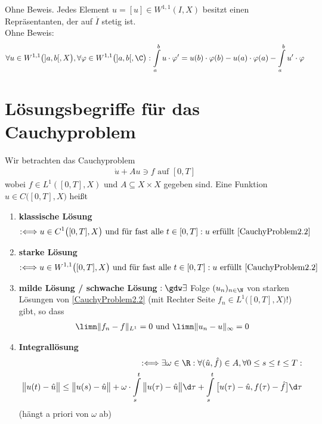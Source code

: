 Ohne Beweis. Jedes Element $u=[u]\in W^{1,1}(I,X)$ besitzt einen Repräsentanten, der auf $\overline{I}$ stetig ist.\\

Ohne Beweis:
\begin{align*}
\forall u\in W^{1,1}\big(]a,b[,X\big),\forall\varphi\in W^{1,1}\big(]a,b[,\C\big):
\int\limits_a^b u\cdot\varphi'=u(b)\cdot\varphi(b)-u(a)\cdot\varphi(a)-\int\limits_a^b u'\cdot\varphi
\end{align*}

\section*{Lösungsbegriffe für das Cauchyproblem} %
Wir betrachten das Cauchyproblem
\begin{align}\label{CauchyProblem2.2}\tag{CP}
\dot{u}+Au\ni f\text{ auf }[0,T] 
\end{align}
wobei $f\in L^1([0,T],X)$ und $A\subseteq X\times X$ gegeben sind. Eine Funktion $u\in C\big([0,T],X)$ heißt
\begin{enumerate}[label=(\alph*)]
\item \textbf{klassische Lösung}
\begin{align*}
:\Longleftrightarrow u\in C^1\big([0,T],X\big)\text{ und für fast alle }t\in[0,T]:u\text{ erfüllt }\eqref{CauchyProblem2.2}
\end{align*}
\item \textbf{starke Lösung}
\begin{align*}
:\Longleftrightarrow u\in W^{1,1}\big([0,T],X\big)\text{ und für fast alle }t\in[0,T]:u\text{ erfüllt }\eqref{CauchyProblem2.2}
\end{align*}
\item \textbf{milde Lösung / schwache Lösung} $:\gdw\exists$ Folge $(u_n)_{n\in\N}$ von starken Lösungen von \eqref{CauchyProblem2.2} (mit Rechter Seite $f_n\in L^1\big([0,T],X\big)$!) gibt, so dass
\begin{align*}
\limn\Vert f_n-f\Vert_{L^1}=0\text{ und }\limn\Vert u_n-u\Vert_\infty=0
\end{align*}
\item \textbf{Integrallösung}
\begin{align*}
:\Longleftrightarrow\exists\omega\in\R:\forall(\hat{u},\hat{f})\in A,\forall 0\leq s\leq t\leq T:\\
\big\Vert u(t)-\hat{u}\big\Vert\leq\big\Vert u(s)-\hat{u}\big\Vert+\omega\cdot\int\limits_s^t\big\Vert u(\tau)-\hat{u}\big\Vert\d\tau+\int\limits_s^t\big[u(\tau)-\hat{u},f(\tau)-\hat{f}\big]\d\tau
\end{align*}
(hängt a priori von $\omega$ ab)
\end{enumerate}
